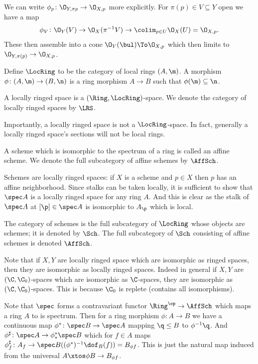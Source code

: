\edefn

\bnote

    We can write $\phi_p\colon\O_{Y,\pi p}\to\O_{X,p}$ more explicitly.
    For $\pi(p)\in V\subseteq Y$ open we have a map
    $$ \phi_V\colon\O_Y(V)\to\O_X(\pi^{-1}V)\to\colim_{p\in U}\O_X(U) = \O_{X,p} . $$
    These then assemble into a cone $\O_Y(\bul)\To\O_{X,p}$ which then limits to $\O_{Y,\pi(p)}\to\O_{X,p}$.

\enote

\bdefn

    Define $\LocRing$ to be the category of local rings $(A,\m)$.
    A morphism $\phi\colon(A,\m)\to(B,\n)$ is a ring morphism $A\to B$ such that $\phi(\m)\subseteq\n$.

    A {\emphcolor locally ringed space} is a $(\Ring,\LocRing)$-space.
    We denote the category of locally ringed spaces by $\LRS$.

\edefn

\bnote

    Importantly, a locally ringed space is not a $\LocRing$-space.
    In fact, generally a locally ringed space's sections will not be local rings.

\enote

A scheme which is isomorphic to the spectrum of a ring is called an {\emphcolor affine scheme}.
We denote the full subcategory of affine schemes by $\AffSch$.

Schemes are locally ringed spaces: if $X$ is a scheme and $p\in X$ then $p$ has an affine neighborhood.
Since stalks can be taken locally, it is sufficient to show that $\spec A$ is a locally ringed space for any ring $A$.
And this is clear as the stalk of $\spec A$ at $[\p]\in\spec A$ is isomorphic to $A_\p$ which is local.

\bdefn

    The {\emphcolor category of schemes} is the full subcategory of $\LocRing$ whose objects are schemes; it is denoted by
    $\Sch$.
    The full subcategory of $\Sch$ consisting of affine schemes is denoted $\AffSch$.

\edefn

Note that if $X,Y$ are locally ringed space which are isomorphic as ringed spaces, then they are isomorphic as locally ringed
spaces.
Indeed in general if $X,Y$ are $(\C,\C_0)$-spaces which are isomorphic as $\C$-spaces, they are isomorphic as
$(\C,\C_0)$-spaces.
This is because $\C_0$ is replete (contains all isomorphisms).

Note that $\spec$ forms a contravariant functor $\Ring^\op\to\AffSch$ which maps a ring $A$ to is spectrum.
Then for a ring morphism $\phi\colon A\to B$ we have a continuous map $\phi^*\colon\spec B\to\spec A$ mapping $\q\leq B$
to $\phi^{-1}\q$.
And $\phi^\sharp\colon\spec A\to \phi^*_*\spec B$ which for $f\in A$ maps
$\phi^\sharp_f\colon A_f\to\spec B((\phi^*)^{-1}\dof_B(f))=B_{\phi f}$.
This is just the natural map induced from the universal $A\xtos\phi B\to B_{\phi f}$.

